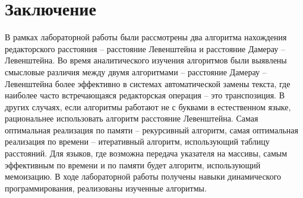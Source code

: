 \chapter{Заключение}

В рамках лабораторной работы были рассмотрены два алгоритма нахождения редакторского расстояния -- расстояние Левенштейна и расстояние Дамерау -- Левенштейна. Во время аналитического изучения алгоритмов были выявлены смысловые различия между двумя алгоритмами -- расстояние Дамерау -- Левенштейна более эффективно в системах автоматической замены текста, где наиболее часто встречающаяся редакторская операция -- это транспозиция. В других случаях, если алгоритмы работают не с буквами в естественном языке, рациональнее использовать алгоритм расстояние Левенштейна. 
Самая оптимальная реализация по памяти -- рекурсивный алгоритм, самая оптимальная реализация по времени -- итеративный алгоритм, использующий таблицу расстояний. Для языков, где возможна передача указателя на массивы, самым эффективным по времени и по памяти будет алгоритм, использующий мемоизацию. 
В ходе лабораторной работы получены навыки динамического программирования, реализованы изученные алгоритмы.